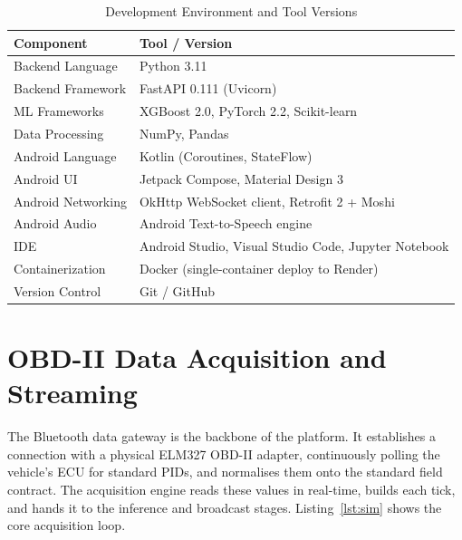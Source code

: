 \documentclass[10pt,a4paper]{report}
\begin{document}
\begin{table}[H]
\centering
\renewcommand{\arraystretch}{1.3}
\begin{tabular}{|p{4.5cm}|p{8.5cm}|}
\hline
\textbf{Component} & \textbf{Tool / Version} \\
\hline
Backend Language & Python 3.11 \\ \hline
Backend Framework & FastAPI 0.111 (Uvicorn) \\ \hline
ML Frameworks & XGBoost 2.0, PyTorch 2.2, Scikit-learn \\ \hline
Data Processing & NumPy, Pandas \\ \hline
Android Language & Kotlin (Coroutines, StateFlow) \\ \hline
Android UI & Jetpack Compose, Material Design 3 \\ \hline
Android Networking & OkHttp WebSocket client, Retrofit 2 + Moshi \\ \hline
Android Audio & Android Text-to-Speech engine \\ \hline
IDE & Android Studio, Visual Studio Code, Jupyter Notebook \\ \hline
Containerization & Docker (single-container deploy to Render) \\ \hline
Version Control & Git / GitHub \\ \hline
\end{tabular}
\caption{Development Environment and Tool Versions}
\end{table}

\section{OBD-II Data Acquisition and Streaming}

The Bluetooth data gateway is the backbone of the platform. It establishes a connection with a physical ELM327 OBD-II adapter, continuously polling the vehicle's ECU for standard PIDs, and normalises them onto the standard field contract. The acquisition engine reads these values in real-time, builds each tick, and hands it to the inference and broadcast stages. Listing~\ref{lst:sim} shows the core acquisition loop.
\end{document}
